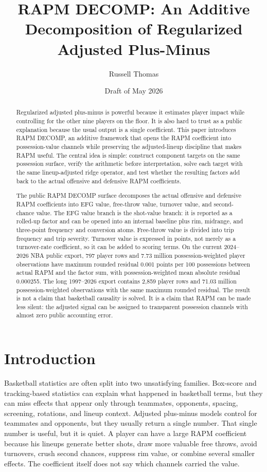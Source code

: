 \documentclass[11pt]{article}
\title{RAPM DECOMP: An Additive Decomposition of Regularized Adjusted Plus-Minus}
\author{Russell Thomas}
\date{Draft of May 2026}
\begin{document}
\maketitle

\begin{abstract}
Regularized adjusted plus-minus is powerful because it estimates player impact
while controlling for the other nine players on the floor.  It is also hard to
trust as a public explanation because the usual output is a single coefficient.
This paper introduces RAPM DECOMP, an additive framework that opens the RAPM
coefficient into possession-value channels while preserving the adjusted-lineup
discipline that makes RAPM useful.  The central idea is simple: construct
component targets on the same possession surface, verify the arithmetic before
interpretation, solve each target with the same lineup-adjusted ridge operator,
and test whether the resulting factors add back to the actual offensive and
defensive RAPM coefficients.

The public RAPM DECOMP surface decomposes the actual offensive and defensive
RAPM coefficients into EFG value, free-throw value, turnover value, and
second-chance value.  The EFG value branch is the shot-value branch: it is
reported as a rolled-up factor and can be opened into an internal baseline plus
rim, midrange, and three-point frequency and conversion atoms.  Free-throw value
is divided into trip frequency and trip severity.  Turnover value is expressed
in points, not merely as a turnover-rate coefficient, so it can be added to
scoring terms.  On the current 2024--2026 NBA public export,
797 player rows and 7.73 million
possession-weighted player observations have maximum rounded residual 0.001
points per 100 possessions between actual RAPM and the factor sum, with
possession-weighted mean absolute residual 0.000255.  The long 1997--2026
export contains 2,859 player rows and 71.03 million possession-weighted
observations with the same maximum rounded residual.  The
result is not a claim that basketball causality is solved.  It is a claim that
RAPM can be made less silent: the adjusted signal can be assigned to transparent
possession channels with almost zero public accounting error.
\end{abstract}

\section{Introduction}

Basketball statistics are often split into two unsatisfying families.  Box-score
and tracking-based statistics can explain what happened in basketball
terms, but they can miss effects that appear only through teammates, opponents,
spacing, screening, rotations, and lineup context.
Adjusted plus-minus models control for teammates and opponents, but they usually
return a single number.  That single number is useful, but it is quiet.  A
player can have a large RAPM coefficient because his lineups generate better
shots, draw more valuable free throws, avoid turnovers, crush second chances,
suppress rim value, or combine several smaller effects.  The coefficient itself
does not say which channels carried the value.
\end{document}
